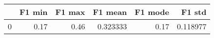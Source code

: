 \begin{tabular}{lrrrrr}
\toprule
{} &  F1 min &  F1 max &   F1 mean &  F1 mode &    F1 std \\
\midrule
0 &    0.17 &    0.46 &  0.323333 &     0.17 &  0.118977 \\
\bottomrule
\end{tabular}
